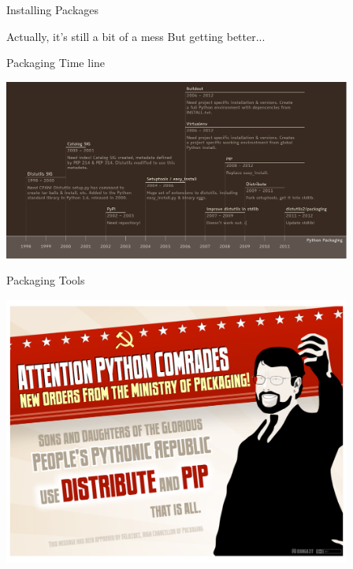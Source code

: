\documentclass{beamer}
\begin{document}
\begin{frame}[fragile]{Installing Packages}

\vfill
{\LARGE Actually, it's still a bit of a mess}
\vfill
{\large But getting better...}
\end{frame} 

\begin{frame}[fragile]{Packaging Time line}

{\centering
\includegraphics[width=4.5in]{PackagingTimeline.pdf}
}
\end{frame} 

\begin{frame}[fragile]{Packaging Tools}

{\centering
\includegraphics[width=4.5in]{packaging1.pdf}
}

\end{frame} 
\end{document}
